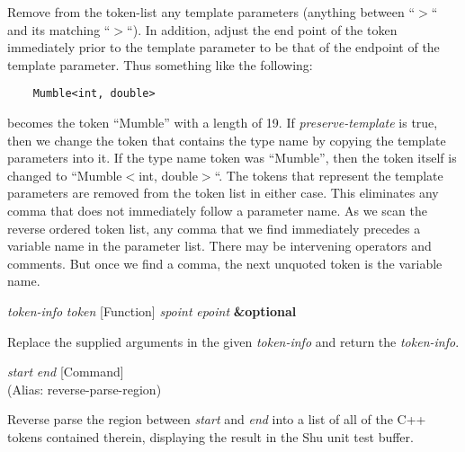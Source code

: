 \begin{doc-string}
Remove from the token-list any template parameters (anything between ``$>$``
and its matching ``$>$``).  In addition, adjust the end point of the token
immediately prior to the template parameter to be that of the endpoint of the
template parameter.
Thus something like the following:
\small{\begin{verbatim}
    Mumble<int, double>
\end{verbatim}}
becomes the token ``Mumble'' with a length of 19.  If \emph{preserve-template} is true,
then we change the token that contains the type name by copying the template
parameters into it.  If the type name token was ``Mumble'', then the token
itself is changed to ``Mumble$<$int, double$>$``.  The tokens that represent the
template parameters are removed from the token list in either case.
This eliminates any comma that does not immediately follow a parameter name.
As we scan the reverse ordered token list, any comma that we find immediately
precedes a variable name in the parameter list.  There may be intervening
operators and comments.  But once we find a comma, the next unquoted token is
the variable name.
\end{doc-string}

\vspace{1em}
\noindent
{}
\usebox{\funcname}\emph{token-info} \emph{token}
 \hfill [Function]
\hspace*{\wd\funcname}\emph{spoint} \emph{epoint} \textbf{\&optional}
\hspace*{\wd\funcname}

\begin{doc-string}
Replace the supplied arguments in the given \emph{token-info} and return the \emph{token-info}.
\end{doc-string}

\vspace{1em}
\noindent
{}
\usebox{\funcname}\emph{start} \emph{end}
 \hfill [Command]\\%
 (Alias: reverse-parse-region)

\begin{doc-string}
Reverse parse the region between \emph{start} and \emph{end} into a list of all of the C++
tokens contained therein, displaying the result in the Shu unit test buffer.
\end{doc-string}

